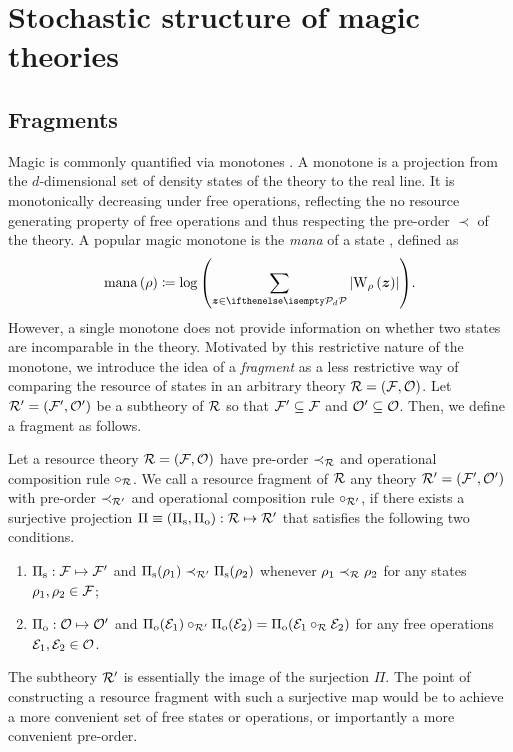 \section{Stochastic structure of magic theories}
\label{sec:struc}

\subsection{Fragments}\label{sec:frag}

Magic is commonly quantified via monotones . 
A monotone is a projection from the $d$-dimensional set of density states of the theory to the real line. 
It is monotonically decreasing under free operations, reflecting the no resource generating property of free operations and thus respecting the pre-order $\prec$ of the theory.
A popular magic monotone is the \emph{mana} of a state , defined as
\begin{equation}
    \mana{\rho} \coloneqq \log{\left(\sum\limits_{\bmz \in \pd} \abs{\W[\bmz]{\rho}}\right)}.
\end{equation}
However, a single monotone does not provide information on whether two states are incomparable in the theory.
Motivated by this restrictive nature of the monotone, we introduce the idea of a \emph{fragment} as a less restrictive way of comparing the resource of states in an arbitrary theory $\mathcal{R} = (\mathcal{F}, \mathcal{O})$. 
Let $\mathcal{R}' = (\mathcal{F}', \mathcal{O}')$ be a subtheory of $\mathcal{R}$ so that $\mathcal{F}' \subseteq \mathcal{F}$ and $\mathcal{O}' \subseteq \mathcal{O}$. 
Then, we define a fragment as follows.
\begin{definition}\label{def:fragment}
    Let a resource theory $\mathcal{R} = (\mathcal{F}, \mathcal{O})$ have pre-order $\prec_{\mathcal{R}}$ and operational composition rule $\circ_{\mathcal{R}}$. 
    We call a resource fragment of $\mathcal{R}$ any theory $\mathcal{R}' = (\mathcal{F}', \mathcal{O}')$ with pre-order $\prec_{\mathcal{R}'}$ and operational composition rule $\circ_{\mathcal{R}'}$, if there exists a surjective projection $\Pi \equiv (\Pi_{\rm{s}}, \Pi_{\rm{o}}): \mathcal{R} \mapsto \mathcal{R}'$ that satisfies the following two conditions.
    \begin{enumerate}
        \item $\Pi_{\rm{s}}: \mathcal{F} \mapsto \mathcal{F}'$ and $\Pi_{\rm{s}}(\rho_1) \prec_{\mathcal{R}'} \Pi_{\rm{s}}(\rho_2)$ whenever $\rho_1 \prec_{\mathcal{R}} \rho_2$ for any states $\rho_1, \rho_2 \in \mathcal{F}$;
        \item $\Pi_{\rm{o}}: \mathcal{O} \mapsto \mathcal{O}'$ and $\Pi_{\rm{o}}(\mathcal{E}_1) \circ_{\mathcal{R}'} \Pi_{\rm{o}}(\mathcal{E}_2) = \Pi_{\rm{o}}(\mathcal{E}_1 \circ_{\mathcal{R}} \mathcal{E}_2)$ for any free operations $\mathcal{E}_1, \mathcal{E}_2 \in \mathcal{O}$. 
    \end{enumerate}
\end{definition}
The subtheory $\mathcal{R}'$ is essentially the image of the surjection $\Pi$.
The point of constructing a resource fragment with such a surjective map would be to achieve a more convenient set of free states or operations, or importantly a more convenient pre-order.

